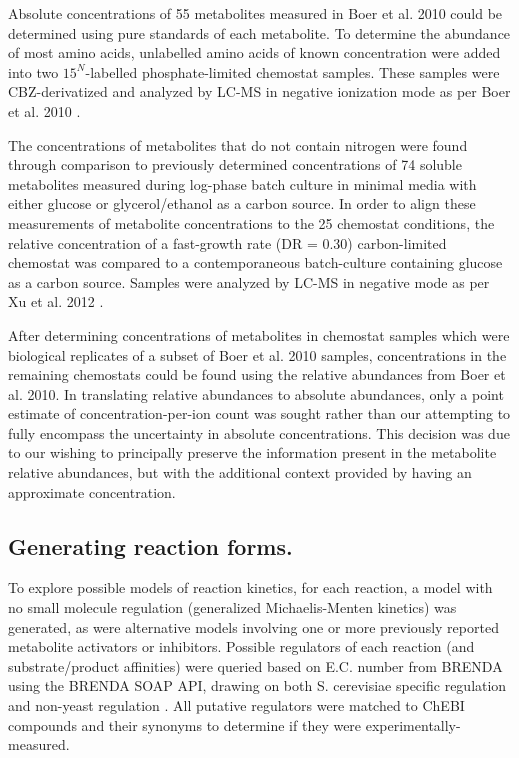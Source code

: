 \documentclass[12pt]{nature}\usepackage{graphicx, color}
\begin{document}
Absolute concentrations of 55 metabolites measured in Boer et al. 2010 could be determined using pure standards of each metabolite.  To determine the abundance of most amino acids, unlabelled amino acids of known concentration were added into two $15^{N}$-labelled phosphate-limited chemostat samples.  These samples were CBZ-derivatized and analyzed by LC-MS in negative ionization mode as per Boer et al. 2010 \cite{main-Boer:2010fb}.

The concentrations of metabolites that do not contain nitrogen were found through comparison to previously determined concentrations of 74 soluble metabolites measured during log-phase batch culture in minimal media with either glucose or glycerol/ethanol as a carbon source.  In order to align these measurements of metabolite concentrations to the 25 chemostat conditions, the relative concentration of a fast-growth rate (DR = 0.30) carbon-limited chemostat was compared to a contemporaneous batch-culture containing glucose as a carbon source.  Samples were analyzed by LC-MS in negative mode as per Xu et al. 2012 \cite{main-Xu:2012gg}.

After determining concentrations of metabolites in chemostat samples which were biological replicates of a subset of Boer et al. 2010 samples, concentrations in the remaining chemostats could be found using the relative abundances from Boer et al. 2010.  In translating relative abundances to absolute abundances, only a point estimate of concentration-per-ion count was sought rather than our attempting to fully encompass the uncertainty in absolute concentrations.  This decision was due to our wishing to principally preserve the information present in the metabolite relative abundances, but with the additional context provided by having an approximate concentration.

\subsection{Generating reaction forms.}

To explore possible models of reaction kinetics, for each reaction, a model with no small molecule regulation (generalized Michaelis-Menten kinetics) was generated, as were alternative models involving one or more previously reported metabolite activators or inhibitors.  Possible regulators of each reaction (and substrate/product affinities) were queried based on E.C. number from BRENDA using the BRENDA SOAP API, drawing on both S. cerevisiae specific regulation and non-yeast regulation \cite{Scheer:2011df}.  All putative regulators were matched to ChEBI compounds \cite{Degtyarenko:2008hx} and their synonyms to determine if they were experimentally-measured.
\end{document}

